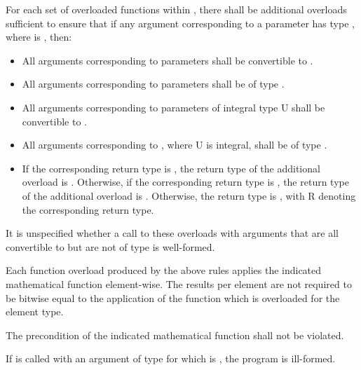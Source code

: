 \pnum \label{cl:cmath-spec} For each set of overloaded functions within , there shall be additional overloads sufficient to ensure that if any argument corresponding to a \double parameter has type \simd[<T, Abi>], where  is \true, then:
\begin{itemize}
  \item All arguments corresponding to \double parameters shall be convertible to \simd[<T, Abi>].

  \item All arguments corresponding to  parameters shall be of type \simd[<T, Abi>*].

  \item All arguments corresponding to parameters of integral type \type U shall be convertible to .

  \item All arguments corresponding to , where \type U is integral, shall be of type .

  \item If the corresponding return type is \double, the return type of the additional overload is \simd[<T, Abi>].
    Otherwise, if the corresponding return type is \bool, the return type of the additional overload is \mask[<T, Abi>].
    Otherwise, the return type is , with \type R denoting the corresponding return type.
\end{itemize}
It is unspecified whether a call to these overloads with arguments that are all convertible to \simd[<T, Abi>] but are not of type \simd[<T, Abi>] is well-formed.

\pnum Each function overload produced by the above rules applies the indicated mathematical function element-wise.
The results per element are not required to be bitwise equal to the application of the function which is overloaded for the element type.

\pnum\requires
  \label{cl:precond-violation}
The precondition of the indicated mathematical function shall not be violated.


\pnum If  is called with an argument of type \simd[<X, Abi>] for which  is \true, the program is ill-formed.

